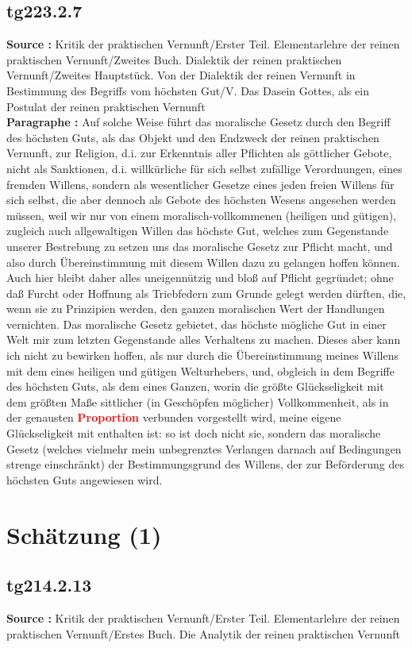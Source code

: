 \documentclass[a4paper,12pt,twoside]{book}
\newcommand{\match}[1]{\textcolor{red}{\textbf{#1}}}
\newcommand{\unnumberedsection}[1]{
	\section*{#1}
	\addcontentsline{toc}{section}{#1}
	\markright{#1}
}
\begin{document}
	\subsection*{tg223.2.7} 
	\textbf{Source : }Kritik der praktischen Vernunft/Erster Teil. Elementarlehre der reinen praktischen Vernunft/Zweites Buch. Dialektik der reinen praktischen Vernunft/Zweites Hauptstück. Von der Dialektik der reinen Vernunft in Bestimmung des Begriffs vom höchsten Gut/V. Das Dasein Gottes, als ein Postulat der reinen praktischen Vernunft\\  
	
	\textbf{Paragraphe : }
	Auf solche Weise führt das moralische Gesetz durch den Begriff des höchsten Guts, als das Objekt und den Endzweck der reinen praktischen Vernunft, zur Religion, d.i. zur Erkenntnis aller Pflichten als göttlicher Gebote, nicht als Sanktionen, d.i. willkürliche für sich selbst zufällige Verordnungen, eines fremden Willens, sondern als wesentlicher Gesetze eines jeden freien Willens für sich selbst, die aber dennoch als Gebote des höchsten Wesens angesehen werden müssen, weil wir nur von einem moralisch-vollkommenen (heiligen und gütigen), zugleich auch allgewaltigen Willen das höchste Gut, welches zum Gegenstande unserer Bestrebung zu setzen uns das moralische Gesetz zur Pflicht macht, und also durch Übereinstimmung mit diesem Willen dazu zu gelangen hoffen können. Auch hier bleibt daher alles uneigennützig und bloß auf Pflicht gegründet; ohne daß Furcht oder Hoffnung als Triebfedern zum Grunde gelegt werden dürften, die, wenn sie zu Prinzipien werden, den ganzen moralischen Wert der Handlungen vernichten. Das moralische Gesetz gebietet, das höchste mögliche Gut in einer Welt mir zum letzten Gegenstande alles Verhaltens zu machen. Dieses aber kann ich nicht zu bewirken hoffen, als nur durch die Übereinstimmung meines Willens mit dem eines heiligen und gütigen Welturhebers, und, obgleich in dem Begriffe des höchsten Guts, als dem eines Ganzen, worin die größte Glückseligkeit mit dem größten Maße sittlicher (in Geschöpfen möglicher) Vollkommenheit, als in der genausten \match{Proportion} verbunden vorgestellt wird, meine eigene Glückseligkeit mit enthalten ist: so ist doch nicht sie, sondern das moralische Gesetz (welches vielmehr mein unbegrenztes Verlangen darnach auf Bedingungen strenge einschränkt) der Bestimmungsgrund des Willens, der zur Beförderung des höchsten Guts angewiesen wird. 
	
	\unnumberedsection{Schätzung (1)} 
	\subsection*{tg214.2.13} 
	\textbf{Source : }Kritik der praktischen Vernunft/Erster Teil. Elementarlehre der reinen praktischen Vernunft/Erstes Buch. Die Analytik der reinen praktischen Vernunft\\  
	
\end{document}
